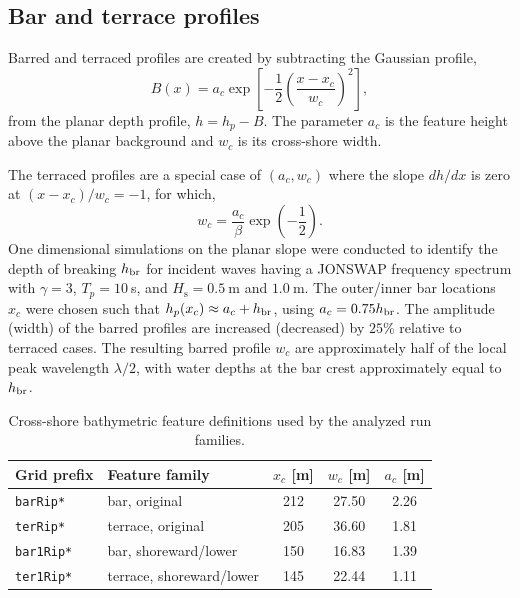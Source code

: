\documentclass[11pt]{article}
\begin{document}
\subsection{Bar and terrace profiles}
Barred and terraced profiles are created by subtracting the Gaussian profile,
\begin{equation}
 B(x)=a_c\exp\left[-\frac{1}{2}\left(\frac{x-x_c}{w_c}\right)^2\right],
\end{equation}
from the planar depth profile, $h=h_p-B$.  The parameter $a_c$
is the feature height above the planar background and $w_c$
is its cross-shore width.

The terraced profiles are a special case of $(a_c,w_c)$ where the slope $dh/dx$ is
zero at $(x-x_c)/w_c=-1$, for which,
\[w_c=\frac{a_c}{\beta}\exp{\left(-\frac{1}{2}\right)}.\]
One dimensional simulations on the planar slope were conducted to identify
the depth of breaking $h_{\rm br}$ for incident waves having a JONSWAP
frequency spectrum with $\gamma=3$, $T_p=10~$s, and
$H_\mathrm{s}= 0.5~$m and $1.0~$m. The outer/inner bar locations $x_c$
were chosen such that $h_p(x_c) \approx a_c+h_{\rm br}$, using
$a_c=0.75 h_{\rm br}$. The amplitude (width) of the barred profiles
are increased (decreased) by $25\%$ relative to terraced cases. The
resulting barred profile $w_c$ are approximately half
of the local peak wavelength $\lambda/2$, with water depths at the bar
crest approximately equal to $h_{\rm br}$. 


\begin{table}[htbp]
\centering
\caption{Cross-shore bathymetric feature definitions used by the analyzed run families.}
\begin{tabular}{llccc}
\toprule
Grid prefix & Feature family & $x_c$ [m] & $w_c$ [m] & $a_c$ [m]\\
\midrule
\texttt{barRip*}  & bar, original & 212 & 27.50 & 2.26\\
\texttt{terRip*}  & terrace, original & 205 & 36.60 & 1.81\\
\texttt{bar1Rip*} & bar, shoreward/lower & 150 & 16.83 & 1.39\\
\texttt{ter1Rip*} & terrace, shoreward/lower & 145 & 22.44 & 1.11\\
\bottomrule
\end{tabular}
\end{table}
\end{document}
